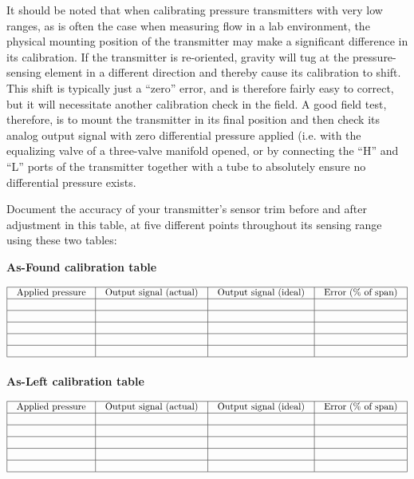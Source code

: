\vskip 10pt

It should be noted that when calibrating pressure transmitters with very low ranges, as is often the case when measuring flow in a lab environment, the physical mounting position of the transmitter may make a significant difference in its calibration.  If the transmitter is re-oriented, gravity will tug at the pressure-sensing element in a different direction and thereby cause its calibration to shift.  This shift is typically just a ``zero'' error, and is therefore fairly easy to correct, but it will necessitate another calibration check in the field.  A good field test, therefore, is to mount the transmitter in its final position and then check its analog output signal with zero differential pressure applied (i.e. with the equalizing valve of a three-valve manifold opened, or by connecting the ``H'' and ``L'' ports of the transmitter together with a tube to absolutely ensure no differential pressure exists.

\filbreak

Document the accuracy of your transmitter's sensor trim before and after adjustment in this table, at five different points throughout its sensing range using these two tables:

\vskip 10pt

{\bf As-Found calibration table}


$$\vbox{\offinterlineskip
\halign{\strut
\vrule \quad\hfil # \ \hfil & 
\vrule \quad\hfil # \ \hfil & 
\vrule \quad\hfil # \ \hfil & 
\vrule \quad\hfil # \ \hfil \vrule \cr
\noalign{\hrule}
%
Applied pressure & Output signal (actual) & Output signal (ideal) & Error (\% of span) \cr
%
\noalign{\hrule}
%
 &  &  & \cr
%
\noalign{\hrule}
%
 &  &  & \cr
%
\noalign{\hrule}
%
 &  &  & \cr
%
\noalign{\hrule}
%
 &  &  & \cr
%
\noalign{\hrule}
%
 &  &  & \cr
%
\noalign{\hrule}
} %
}$$ %

\vskip 10pt

{\bf As-Left calibration table}


$$\vbox{\offinterlineskip
\halign{\strut
\vrule \quad\hfil # \ \hfil & 
\vrule \quad\hfil # \ \hfil & 
\vrule \quad\hfil # \ \hfil & 
\vrule \quad\hfil # \ \hfil \vrule \cr
\noalign{\hrule}
%
Applied pressure & Output signal (actual) & Output signal (ideal) & Error (\% of span) \cr
%
\noalign{\hrule}
%
 &  &  & \cr
%
\noalign{\hrule}
%
 &  &  & \cr
%
\noalign{\hrule}
%
 &  &  & \cr
%
\noalign{\hrule}
%
 &  &  & \cr
%
\noalign{\hrule}
%
 &  &  & \cr
%
\noalign{\hrule}
} %
}$$ %

